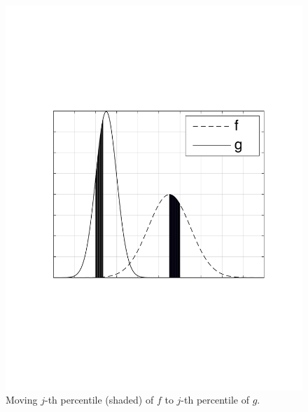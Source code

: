\documentclass[10pt]{article}
\begin{document}
\begin{figure}[H]
\centering
\includegraphics[scale = .4]{2ndPPercentile.pdf}
\caption{Moving $j$-th percentile (shaded) of $f$ to $j$-th percentile of $g$.}
\label{fig: 1DWD}
\end{figure}
\end{document}
